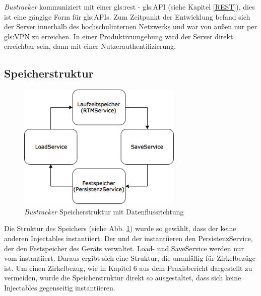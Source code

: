 \emph{Bustracker} kommuniziert mit einer \gls{gls:rest} - \gls{gls:API} (siehe Kapitel \ref{REST}), dies ist eine gängige Form für \glspl{gls:API}. Zum Zeitpunkt der Entwicklung befand sich der Server innerhalb des hochschulinternen Netzwerks und war von außen nur per \gls{gls:VPN} zu erreichen. In einer Produktivumgebung wird der Server direkt erreichbar sein, dann mit einer Nutzerauthentifizierung.

\subsection{Speicherstruktur}
\begin{figure}[htbp] 
  \centering
     \includegraphics[width=0.7\textwidth]{images/Speicherstruktur.png} 
  \caption{\emph{Bustracker} Speicherstruktur mit Datenflussrichtung}
  \label{fig:Speicherstruktur}
\end{figure}

Die Struktur des Speichers (siehe Abb. \ref{fig:Speicherstruktur}) wurde so gewählt, dass der  keine anderen Injectables instantiiert. 
Der  und der  instantiieren den PersistenzService, der den Festspeicher des Geräts verwaltet. Load- und SaveService werden nur vom  instantiiert. Daraus ergibt sich eine Struktur, die unanfällig für Zirkelbezüge ist.   
Um einen Zirkelbezug, wie in Kapitel 6 aus dem Praxisbericht \cite{PraxBerJoSc} dargestellt zu vermeiden, wurde die Speicherstruktur direkt so ausgestaltet, dass sich keine Injectables gegenseitig instantiieren.
 

